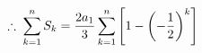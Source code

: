 \documentclass[preview]{standalone}
\begin{document}
\begin{align*}
\special{dvisvgm:raw <g id='unique000'>}\therefore\; \sum_{k=1}^{n}S_k=\frac{2a_1}{3}\sum_{k=1}^{n}\left[1-\left(-\frac{1}{2}\right)^k\right]\special{dvisvgm:raw </g>}
\end{align*}
\end{document}
